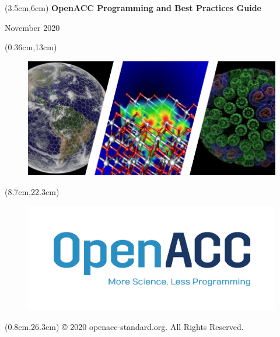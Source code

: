 \documentclass[letterpaper,fontsize=20pt]{scrartcl}
\begin{document}
\begin{textblock*}{15cm}(3.5cm,6cm) %
\noindent
\textcolor{myblue}{\textbf{ \huge OpenACC Programming \newline and Best Practices Guide}}

\noindent
\textcolor{myblue2}{ November 2020}
\end{textblock*}

\begin{textblock*}{19.408cm}(0.36cm,13cm)
\begin{figure}
 \includegraphics[width=\textwidth]{app_images.png}
\end{figure}
\end{textblock*}

\begin{textblock*}{10.7cm}(8.7cm,22.3cm)
\begin{figure}[hb!]
 \includegraphics[width=\textwidth]{logo.png}
\end{figure}
\end{textblock*}

\begin{textblock*}{10.7cm}(0.8cm,26.3cm)
\textcolor{myblue}{ \tiny © 2020 openacc-standard.org. All Rights Reserved.}
\end{textblock*}



\end{document}
